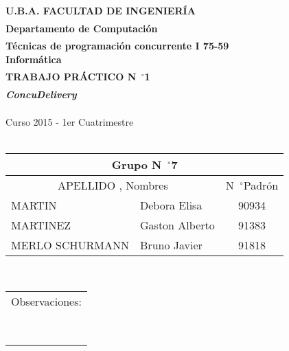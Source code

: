 \documentclass[11pt,spanish,a4paper,openany,notitlepage]{article}
\newcommand{\grad}{\hspace{-2mm}$\phantom{a}^{\circ}$} %
\begin{document}
\setcounter{page}{0}

\begin{center}
\textbf{\LARGE U.B.A.    FACULTAD DE INGENIERÍA\\
$\phantom{a}$\\
Departamento de Computación\\
$\phantom{a}$\\
Técnicas de programación concurrente I  75-59\\
Informática\\
$\phantom{a}$\\
TRABAJO PRÁCTICO N\grad 1\\
$\phantom{a}$\\
\textit{ConcuDelivery}}

\end{center}
$\phantom{a}$\\
Curso 2015 - 1er Cuatrimestre\\
\phantom{a}\\

\begin{tabular}{| l l |  r}%
\hline
\multicolumn{3}{|c|}{Grupo N\grad 7}\\
\hline
\multicolumn{2}{|c|}{APELLIDO , Nombres} &\multicolumn{1}{c|}{N\grad  Padrón}\\
\hline
MARTIN & Debora Elisa & \multicolumn{1}{c|}{90934}\\ \hline
MARTINEZ & Gaston Alberto & \multicolumn{1}{c|}{91383}\\ \hline
MERLO SCHURMANN  & Bruno Javier  & \multicolumn{1}{c|}{91818}\\ \hline
\end{tabular}
\\

\phantom{X\\X\\X\\X\\X\\}
\begin{tabular}{|l|}%
\hline
Observaciones: \\
\phantom{XXXXXXXXXXXXXXXXXXXXXXXXXXXXXXXXXXXXXXXXXXXXXXX}\\
\phantom{XXXXXXXXXXXXXXXXXXXXXXXXXXXXXXXXXXXXXXXXXXXXXXX}\\
\phantom{XXXXXXXXXXXXXXXXXXXXXXXXXXXXXXXXXXXXXXXXXXXXXXX}\\
\phantom{XXXXXXXXXXXXXXXXXXXXXXXXXXXXXXXXXXXXXXXXXXXXXXX}\\
\phantom{XXXXXXXXXXXXXXXXXXXXXXXXXXXXXXXXXXXXXXXXXXXXXXX}\\
\phantom{XXXXXXXXXXXXXXXXXXXXXXXXXXXXXXXXXXXXXXXXXXXXXXX}\\
\phantom{XXXXXXXXXXXXXXXXXXXXXXXXXXXXXXXXXXXXXXXXXXXXXXX}\\
\phantom{XXXXXXXXXXXXXXXXXXXXXXXXXXXXXXXXXXXXXXXXXXXXXXX}\\
\hline
\end{tabular}
\end{document}
